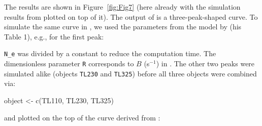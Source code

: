 The results are shown in Figure\(~\) \ref{fig:Fig7} (here already with
the simulation results from  plotted on top of it).
The output of  is a three-peak-shaped curve. To
simulate the same curve in , we used the parameters
from the model by \citet{Bailey_2001yo} (his Table 1), e.g., for the
first peak:

\begin{Schunk}
\end{Schunk}

\noindent{}\texttt{N\_e} was divided by a constant to reduce the computation time.
The dimensionless parameter \texttt{R} corresponds to \(B\) (s\(^{-1}\))
in \citet{Bailey_2001yo}. The other two peaks were simulated alike
(objects \texttt{TL230} and \texttt{TL325}) before all three objects
were combined via:

\begin{Schunk}
\begin{Sinput}
object <- c(TL110, TL230, TL325)
\end{Sinput}
\end{Schunk}

\noindent{}and plotted on the top of the curve derived from :

\begin{Schunk}
\end{Schunk}


